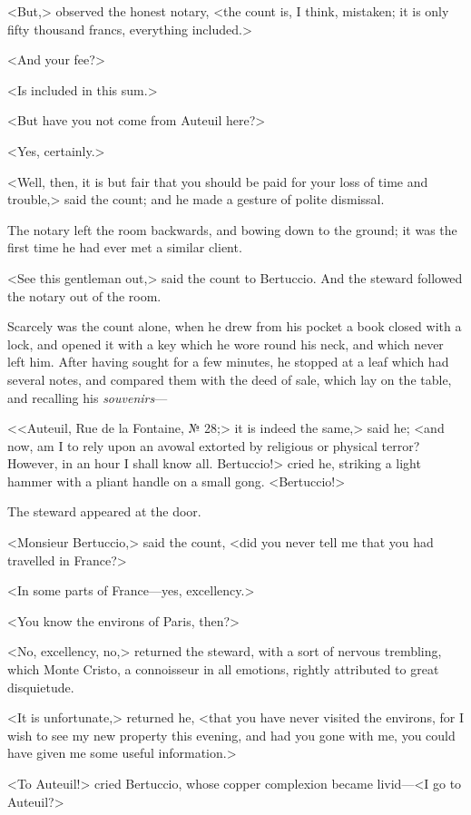  <But,> observed the honest notary, <the count is, I think, mistaken; it is only fifty thousand francs, everything included.> 

 <And your fee?> 

 <Is included in this sum.> 

 <But have you not come from Auteuil here?> 

 <Yes, certainly.> 

 <Well, then, it is but fair that you should be paid for your loss of time and trouble,> said the count; and he made a gesture of polite dismissal. 

 The notary left the room backwards, and bowing down to the ground; it was the first time he had ever met a similar client. 

 <See this gentleman out,> said the count to Bertuccio. And the steward followed the notary out of the room. 

 Scarcely was the count alone, when he drew from his pocket a book closed with a lock, and opened it with a key which he wore round his neck, and which never left him. After having sought for a few minutes, he stopped at a leaf which had several notes, and compared them with the deed of sale, which lay on the table, and recalling his \textit{souvenirs}— 

 <<Auteuil, Rue de la Fontaine, № 28;> it is indeed the same,> said he; <and now, am I to rely upon an avowal extorted by religious or physical terror? However, in an hour I shall know all. Bertuccio!> cried he, striking a light hammer with a pliant handle on a small gong. <Bertuccio!> 

 The steward appeared at the door. 

 <Monsieur Bertuccio,> said the count, <did you never tell me that you had travelled in France?> 

 <In some parts of France—yes, excellency.> 

 <You know the environs of Paris, then?> 

 <No, excellency, no,> returned the steward, with a sort of nervous trembling, which Monte Cristo, a connoisseur in all emotions, rightly attributed to great disquietude. 

 <It is unfortunate,> returned he, <that you have never visited the environs, for I wish to see my new property this evening, and had you gone with me, you could have given me some useful information.> 

 <To Auteuil!> cried Bertuccio, whose copper complexion became livid—<I go to Auteuil?> 


